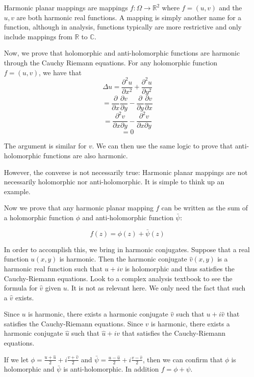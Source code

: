 Harmonic planar mappings are mappings $f : \Omega \rightarrow \mathbb{R}^2$ where $f = (u,v)$ and the $u,v$ are both harmonic real functions. A mapping is simply another name for a function, although in analysis, functions typically are more restrictive and only include mappings from $\mathbb{R}$ to $\mathbb{C}$.

Now, we prove that holomorphic and anti-holomorphic functions are harmonic through the Cauchy Riemann equations. For any holomorphic function $f = (u,v)$, we have that 
$$\Delta u = \frac{\partial^2 u}{\partial x^2} + \frac{\partial^2 u}{\partial y^2}$$
$$ = \frac{\partial}{\partial x} \frac{\partial v}{\partial y} - \frac{\partial}{\partial y} \frac{\partial v}{\partial x}$$
$$ = \frac{\partial^2 v}{\partial x \partial y} - \frac{\partial^2 v}{\partial x \partial y}$$
$$ = 0$$

The argument is similar for $v$. We can then use the same logic to prove that anti-holomorphic functions are also harmonic. 

However, the converse is not necessarily true: Harmonic planar mappings are not necessarily holomorphic nor anti-holomorphic. It is simple to think up an example. %


Now we prove that any harmonic planar mapping $f$ can be written as the sum of a holomorphic function $\phi$ and anti-holomorphic function $\bar{\psi}$:

\begin{equation}
\label{eq:decomposition}
f(z) = \phi(z) + \bar{\psi}(z)
\end{equation}

In order to accomplish this, we bring in harmonic conjugates. Suppose that a real function $u(x,y)$ is harmonic. Then the harmonic conjugate $\hat{v}(x,y)$ is a harmonic real function such that $u + iv$ is holomorphic and thus satisfies the Cauchy-Riemann equations. Look to a complex analysis textbook to see the formula for $\hat{v}$ given $u$. It is not as relevant here. We only need the fact that such a $\hat{v}$ exists.

Since $u$ is harmonic, there exists a harmonic conjugate $\hat{v}$ such that $u + i \hat{v}$ that satisfies the Cauchy-Riemann equations. Since $v$ is harmonic, there exists a harmonic conjugate $\hat{u}$ such that $\hat{u} + i v$ that satisfies the Cauchy-Riemann equations.

If we let $\phi = \frac{u + \hat{u}}{2} + i \frac{v + \hat{v}}{2}$ and $\bar{\psi} = \frac{u - \hat{u}}{2} + i \frac{v - \hat{v}}{2}$, then we can confirm that $\phi$ is holomorphic and $\bar{\psi}$ is anti-holomorphic. In addition $f = \phi + \psi$. 

